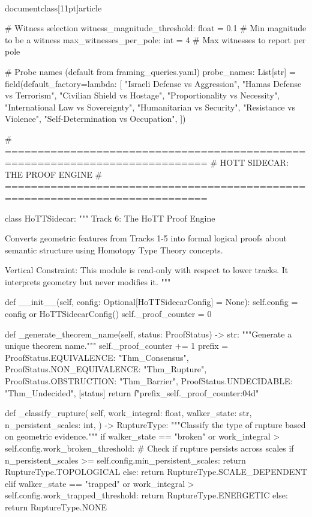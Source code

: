 \\documentclass[11pt]{article}
\begin{document}
\begin{CodeBlock}
    # Witness selection
    witness_magnitude_threshold: float = 0.1  # Min magnitude to be a witness
    max_witnesses_per_pole: int = 4       # Max witnesses to report per pole

    # Probe names (default from framing_queries.yaml)
    probe_names: List[str] = field(default_factory=lambda: [
        "Israeli Defense vs Aggression",
        "Hamas Defense vs Terrorism",
        "Civilian Shield vs Hostage",
        "Proportionality vs Necessity",
        "International Law vs Sovereignty",
        "Humanitarian vs Security",
        "Resistance vs Violence",
        "Self-Determination vs Occupation",
    ])


# =============================================================================
# HOTT SIDECAR: THE PROOF ENGINE
# =============================================================================

class HoTTSidecar:
    """
    Track 6: The HoTT Proof Engine

    Converts geometric features from Tracks 1-5 into formal logical proofs
    about semantic structure using Homotopy Type Theory concepts.

    Vertical Constraint: This module is read-only with respect to lower tracks.
    It interprets geometry but never modifies it.
    """

    def __init__(self, config: Optional[HoTTSidecarConfig] = None):
        self.config = config or HoTTSidecarConfig()
        self._proof_counter = 0

    def _generate_theorem_name(self, status: ProofStatus) -> str:
        """Generate a unique theorem name."""
        self._proof_counter += 1
        prefix = {
            ProofStatus.EQUIVALENCE: "Thm_Consensus",
            ProofStatus.NON_EQUIVALENCE: "Thm_Rupture",
            ProofStatus.OBSTRUCTION: "Thm_Barrier",
            ProofStatus.UNDECIDABLE: "Thm_Undecided",
        }[status]
        return f"{prefix}_{self._proof_counter:04d}"

    def _classify_rupture(
        self,
        work_integral: float,
        walker_state: str,
        n_persistent_scales: int,
    ) -> RuptureType:
        """Classify the type of rupture based on geometric evidence."""
        if walker_state == "broken" or work_integral > self.config.work_broken_threshold:
            # Check if rupture persists across scales
            if n_persistent_scales >= self.config.min_persistent_scales:
                return RuptureType.TOPOLOGICAL
            else:
                return RuptureType.SCALE_DEPENDENT
        elif walker_state == "trapped" or work_integral > self.config.work_trapped_threshold:
            return RuptureType.ENERGETIC
        else:
            return RuptureType.NONE


\end{CodeBlock}
\end{document}
